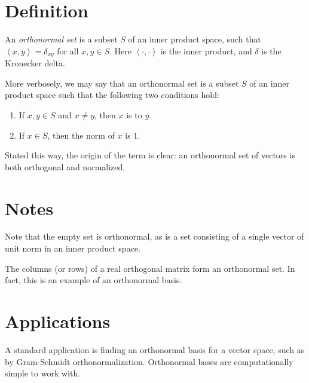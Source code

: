 \documentclass{article}
\def\ip#1{{\left\langle #1\right\rangle}}
\begin{document}

\section*{Definition}

An \emph{orthonormal set} is a subset $S$ of an inner product space,
such that $\ip{x,y}=\delta_{xy}$ for all $x,y\in S$.
Here $\ip{\cdot,\cdot}$ is the inner product,
and $\delta$ is the Kronecker delta.

More verbosely, we may say that an orthonormal set
is a subset $S$ of an inner product space
such that the following two conditions hold:
\begin{enumerate}
\item If $x,y \in S$ and $x\ne y$, then $x$ is  to $y$.
\item If $x \in S$, then the norm of $x$ is $1$.
\end{enumerate}
Stated this way, the origin of the term is clear:
an orthonormal set of vectors is both orthogonal and normalized.

\section*{Notes}

Note that the empty set is orthonormal,
as is a set consisting of a single vector of unit norm
in an inner product space.

The columns (or rows) of a real orthogonal matrix form an orthonormal set.
In fact, this is an example of an orthonormal basis.

\section*{Applications}

A standard application is finding an orthonormal basis for a vector space,
such as by Gram-Schmidt orthonormalization.
Orthonormal bases are computationally simple to work with.
\end{document}
